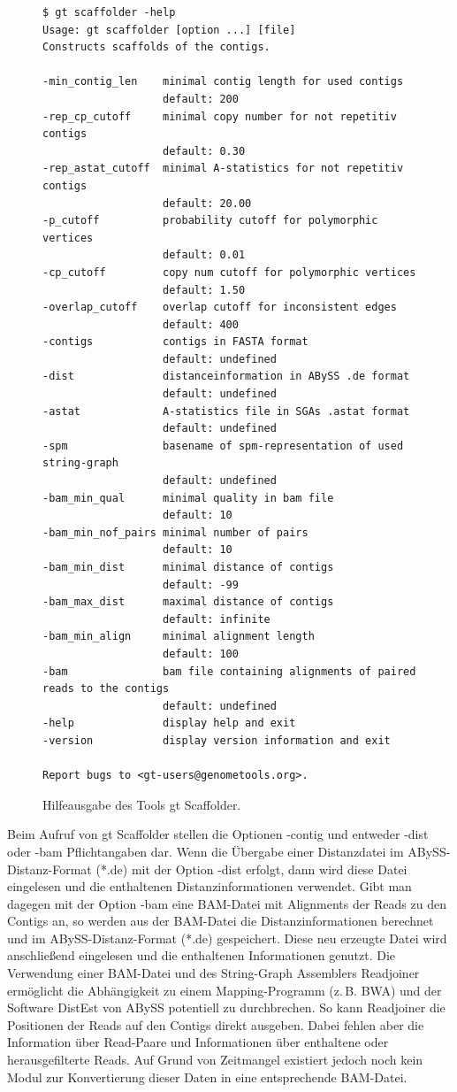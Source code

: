 \documentclass[a4paper,11pt,parskip,abstract=on]{scrartcl}
\begin{document}
\begin{figure}
\begin{verbatim}
$ gt scaffolder -help
Usage: gt scaffolder [option ...] [file]
Constructs scaffolds of the contigs.

-min_contig_len    minimal contig length for used contigs
                   default: 200
-rep_cp_cutoff     minimal copy number for not repetitiv contigs
                   default: 0.30
-rep_astat_cutoff  minimal A-statistics for not repetitiv contigs
                   default: 20.00
-p_cutoff          probability cutoff for polymorphic vertices
                   default: 0.01
-cp_cutoff         copy num cutoff for polymorphic vertices
                   default: 1.50
-overlap_cutoff    overlap cutoff for inconsistent edges
                   default: 400
-contigs           contigs in FASTA format
                   default: undefined
-dist              distanceinformation in ABySS .de format
                   default: undefined
-astat             A-statistics file in SGAs .astat format
                   default: undefined
-spm               basename of spm-representation of used string-graph
                   default: undefined
-bam_min_qual      minimal quality in bam file
                   default: 10
-bam_min_nof_pairs minimal number of pairs
                   default: 10
-bam_min_dist      minimal distance of contigs
                   default: -99
-bam_max_dist      maximal distance of contigs
                   default: infinite
-bam_min_align     minimal alignment length
                   default: 100
-bam               bam file containing alignments of paired reads to the contigs
                   default: undefined
-help              display help and exit
-version           display version information and exit

Report bugs to <gt-users@genometools.org>.
\end{verbatim}
\caption{\label{abb: help}Hilfeausgabe des Tools gt Scaffolder.}
\end{figure}

Beim Aufruf von gt Scaffolder stellen die Optionen -contig und
entweder -dist oder -bam Pflichtangaben dar. Wenn die Übergabe einer
Distanzdatei im ABySS-Distanz-Format (*.de) mit der Option -dist
erfolgt, dann wird diese Datei eingelesen und die enthaltenen
Distanzinformationen verwendet.  Gibt man dagegen mit der Option -bam
eine BAM-Datei mit Alignments der Reads zu den Contigs an, so werden
aus der BAM-Datei die Distanzinformationen berechnet und im
ABySS-Distanz-Format (*.de) gespeichert. Diese neu erzeugte Datei wird
anschließend eingelesen und die enthaltenen Informationen genutzt.
Die Verwendung einer BAM-Datei und des String-Graph Assemblers
Readjoiner ermöglicht die Abhängigkeit zu einem Mapping-Programm
(z.\,B. BWA) und der Software DistEst von ABySS potentiell zu
durchbrechen. So kann Readjoiner die Positionen der Reads auf den
Contigs direkt ausgeben. Dabei fehlen aber die Information über
Read-Paare und Informationen über enthaltene oder herausgefilterte
Reads. Auf Grund von Zeitmangel existiert jedoch noch kein Modul zur
Konvertierung dieser Daten in eine entsprechende BAM-Datei.
\end{document}

